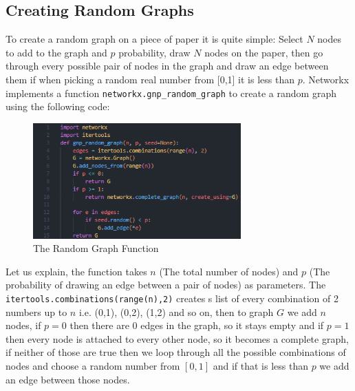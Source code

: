 \documentclass{article}
\begin{document}
        \subsection{Creating Random Graphs}
        To create a random graph on a piece of paper it is quite simple: Select $N$ nodes to add to the graph and $p$ probability, draw $N$ nodes on the paper, then go through every possible pair of nodes in the graph and draw an edge between them if when picking a random real number from [0,1] it is less than $p$. Networkx implements a function \verb|networkx.gnp_random_graph| to create a random graph using the following code:\\
        \begin{figure}[H]
            \includegraphics[width=8cm]{images/CreatingRandomGraphs.png}
            \caption{The Random Graph Function}
            \label{fig:RandomGraph1}
        \end{figure}
        Let us explain, the function takes $n$ (The total number of nodes) and $p$ (The probability of drawing an edge between a pair of nodes) as parameters. The \verb|itertools.combinations(range(n),2)| creates s list of every combination of 2 numbers up to $n$ i.e. (0,1), (0,2), (1,2) and so on, then to graph $G$ we add $n$ nodes, if $p = 0$ then there are 0 edges in the graph, so it stays empty and if $p =1$ then every node is attached to every other node, so it becomes a complete graph, if neither of those are true then we loop through all the possible combinations of nodes and choose a random number from $[0,1]$ and if that is less than $p$ we add an edge between those nodes.
\end{document}
